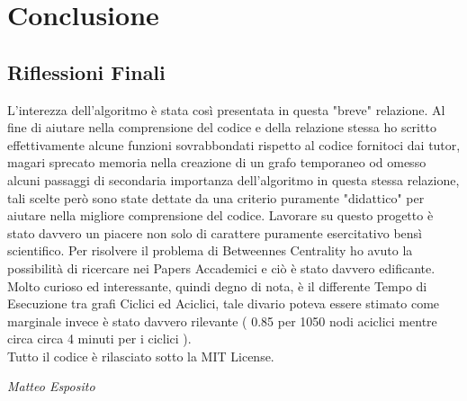 \chapter{Conclusione}
\section{Riflessioni Finali}
L'interezza dell'algoritmo è stata così presentata in questa "breve" relazione. Al fine di aiutare nella comprensione del codice e della relazione stessa ho scritto effettivamente alcune funzioni sovrabbondati rispetto al codice fornitoci dai tutor, magari sprecato memoria nella creazione di un grafo temporaneo od omesso alcuni passaggi di secondaria importanza dell'algoritmo in questa stessa relazione, tali scelte però sono state dettate da una criterio puramente "didattico" per aiutare nella migliore comprensione del codice.
Lavorare su questo progetto è stato davvero un piacere non solo di carattere puramente esercitativo bensì scientifico. Per risolvere il problema di Betweennes Centrality ho avuto la possibilità di ricercare nei Papers Accademici e ciò è stato davvero edificante. Molto curioso ed interessante, quindi degno di nota, è il differente Tempo di Esecuzione tra grafi Ciclici ed Aciclici, tale divario poteva essere stimato come marginale invece è stato davvero rilevante ( 0.85 per 1050 nodi aciclici mentre circa circa 4 minuti per i ciclici ).
\\
Tutto il codice è rilasciato sotto la MIT License. 
\begin{flushright}
	\emph{Matteo Esposito}
\end{flushright}